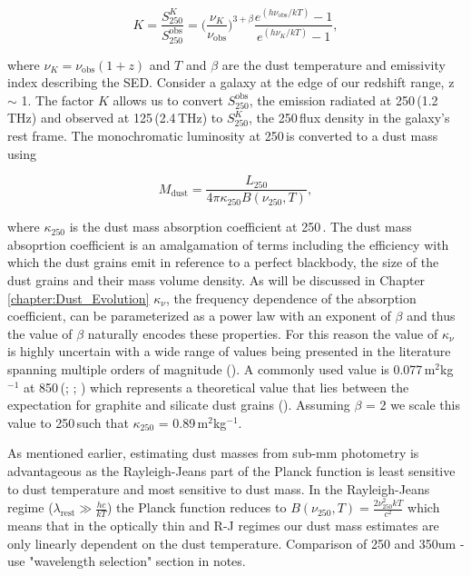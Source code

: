 \begin{equation}
    K = \frac{S_{250}^{K}}{S_{250}^{\textrm{obs}}} = \Bigg(\frac{\nu_{K}}{\nu_{\textrm{obs}}}\Bigg)^{3+\beta}\frac{e^{(h\nu_{\textrm{obs}}/kT)} - 1}{e^{(h\nu_{K}/kT)} - 1},
\label{eq:k_correction}
\end{equation}

\noindent where $\nu_{K} = \nu_{\textrm{obs}}(1+z)$ and $T$ and $\beta$ are the dust temperature and emissivity index describing the SED. Consider a galaxy at the edge of our redshift range, z $\sim$ 1. The factor $K$ allows us to convert $S_{250}^{\textrm{obs}}$, the emission radiated at 250\,\micron (1.2\,THz) and observed at 125\,\micron (2.4\,THz) to $S_{250}^{K}$, the 250\,\micron flux density in the galaxy's rest frame. The monochromatic luminosity at 250\,\micron is converted to a dust mass using

\begin{equation}
    M_{\textrm{dust}} = \frac{L_{250}}{4\pi\kappa_{250}B(\nu_{250}, T)},
\label{fig:dust_mass}
\end{equation}

\noindent where $\kappa_{250}$ is the dust mass absorption coefficient at 250\,\micron. The dust mass absoprtion coefficient is an amalgamation of terms including the efficiency with which the dust grains emit in reference to a perfect blackbody, the size of the dust grains and their mass volume density. As will be discussed in Chapter \ref{chapter:Dust_Evolution} $\kappa_\nu$, the frequency dependence of the absorption coefficient, can be parameterized as a power law with an exponent of $\beta$ and thus the value of $\beta$ naturally encodes these properties. For this reason the value of $\kappa_\nu$ is highly uncertain with a wide range of values being presented in the literature spanning multiple orders of magnitude (\citealt{Clark_2019}). A commonly used value is 0.077\,m$^{2}$kg$^{-1}$ at 850\,\micron (\citealt{Dunne_2000}; \citealt{daCunha_2008}; \citealt{Dunne_2011}) which represents a theoretical value that lies between the expectation for graphite and silicate dust grains (\citealt{Draine_1984}). Assuming $\beta$ = 2 we scale this value to 250\,\micron such that $\kappa_{250}$ = 0.89\,m$^{2}$kg$^{-1}$.

As mentioned earlier, estimating dust masses from sub-mm photometry is advantageous as the Rayleigh-Jeans part of the Planck function is least sensitive to dust temperature and most sensitive to dust mass. In the Rayleigh-Jeans regime ($\lambda_{\textrm{rest}} \gg \frac{hc}{kT}$) the Planck function reduces to $B(\nu_{250}, T) = \frac{2\nu_{250}^{2}kT}{c^2}$ which means that in the optically thin and R-J regimes our dust mass estimates are only linearly dependent on the dust temperature. {\color{red} Comparison of 250 and 350um - use "wavelength selection" section in notes.}

